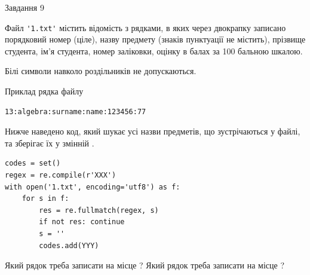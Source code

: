 \documentclass[12pt, ukrainian]{article}
\def\code#1{\Verb!#1!}
\begin{document}
{\begin{minipage}[t]{8.0cm}
\end{minipage}

               
{\begin{center}Завдання {9}\end{center}}
\vspace{-4mm}
Файл \code{'1.txt'} містить відомість з рядками, в яких через двокрапку записано поряд\-ковий номер (ціле), назву предмету (знаків пунктуації не містить), прізвище студента, ім'я студента, номер заліковки, оцінку в балах за 100 бальною шкалою.

Білі символи навколо роздільників не допускаються.

Приклад рядка файлу



\begin{verbatim}
13:algebra:surname:name:123456:77
\end{verbatim}


Нижче наведено код, який шукає усі назви предметів, що зустрічаються у файлі, та зберігає їх у змінній .



\begin{verbatim}
codes = set()
regex = re.compile(r'XXX')
with open('1.txt', encoding='utf8') as f:
    for s in f:
        res = re.fullmatch(regex, s)
        if not res: continue
        s = ''
        codes.add(YYY)
\end{verbatim}



Який рядок треба записати на місце  ?
Який рядок треба записати на місце  ?\par

}
\end{document}
